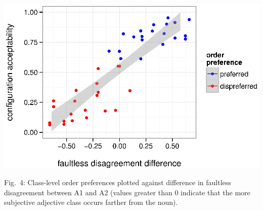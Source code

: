 \documentclass[12pt]{article}
\begin{document}
\begin{minipage}[t]{.48\linewidth}
	\vspace{0pt}	
	\begin{center}
		\includegraphics[width=\linewidth]{plots/faultless_order_preference.eps}
	\end{center}
	Fig.~4: Class-level order preferences plotted against difference in faultless disagreement between A1 and A2 (values greater than 0 indicate that the more subjective adjective class occurs farther from the noun).
\end{minipage}


\newpage
\end{document}
